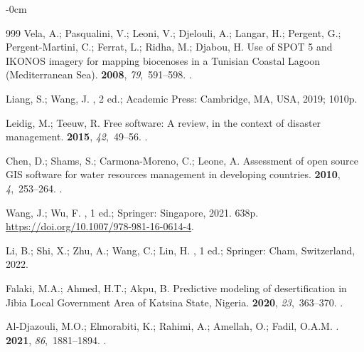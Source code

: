\documentclass[land,article,accept,pdftex,moreauthors]{Definitions/mdpi}
\begin{document}
\begin{adjustwidth}{-\extralength}{0cm}
\begin{thebibliography}{999}
Vela, A.; Pasqualini, V.; Leoni, V.; Djelouli, A.; Langar, H.; Pergent, G.;
  Pergent-Martini, C.; Ferrat, L.; Ridha, M.; Djabou, H.
\newblock Use of SPOT 5 and IKONOS imagery for mapping biocenoses in a Tunisian
  Coastal Lagoon (Mediterranean Sea).
 {\bf 2008}, {\em
  79},~591--598.
.

Liang, S.; Wang, J.
, 2 ed.; Academic Press: Cambridge, MA, USA, %
 2019; 
\newblock 1010p.

Leidig, M.; Teeuw, R.
\newblock Free software: A review, in the context of disaster management.
 {\bf 2015}, {\em 42},~49--56.
.

Chen, D.; Shams, S.; Carmona-Moreno, C.; Leone, A.
\newblock Assessment of open source GIS software for water resources management
  in developing countries.
 {\bf 2010}, {\em
  4},~253--264.
.

Wang, J.; Wu, F.
, 1 ed.; Springer: Singapore,  2021.
\newblock 638p. {\url{https://doi.org/10.1007/978-981-16-0614-4}}.

Li, B.; Shi, X.; Zhu, A.; Wang, C.; Lin, H.
, 1 ed.; Springer: Cham, Switzerland, 2022.

Falaki, M.A.; Ahmed, H.T.; Akpu, B.
\newblock Predictive modeling of desertification in Jibia Local Government Area
  of Katsina State, Nigeria.
 {\bf
  2020}, {\em 23},~363--370.
.

Al-Djazouli, M.O.; Elmorabiti, K.; Rahimi, A.; Amellah, O.; Fadil, O.A.M.
.
 {\bf 2021}, {\em 86},~1881--1894.
.


\end{thebibliography}
\end{adjustwidth}
\end{document}
